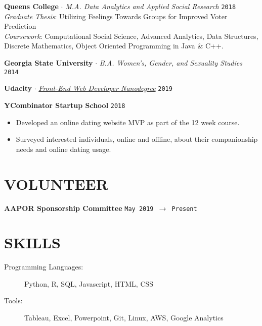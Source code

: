 \documentclass[margin, line, 11pt]{res}
\begin{document}
\begin{resume}
{\bf Queens College} $\cdot$ {\it M.A. Data Analytics and Applied Social Research} \hfill \texttt{2018}
\\{\it Graduate Thesis}: Utilizing Feelings Towards Groups for Improved Voter Prediction
\\{\it Coursework}: Computational Social Science, Advanced Analytics, Data Structures, Discrete 
Mathematics, Object Oriented Programming in Java \& C++.

{\bf Georgia State University} $\cdot$ {\it B.A. Women's, Gender, and Sexuality Studies} \hfill \texttt{2014}

{\bf Udacity} $\cdot$ {\it \href{https://confirm.udacity.com/VUHFGNF6}{Front-End Web Developer Nanodegree}} \hfill \texttt{2019}

{\bf YCombinator Startup School} \hfill \texttt{2018}
\begin{itemize}
\item Developed an online dating website MVP as part of the 12 week course. 
\item Surveyed interested individuals, online and offline, about their companionship needs and online dating usage.
\end{itemize}

\section{VOLUNTEER}

{\bf AAPOR Sponsorship Committee} \hfill\texttt{May 2019 $\to$ Present}

\section{SKILLS}
\begin{description}
\item[Programming Languages:] Python, R, SQL, Javascript, HTML, CSS
\item[Tools:] Tableau, Excel, Powerpoint, Git, Linux, AWS, Google Analytics
\end{description}


\end{resume}
\end{document}
